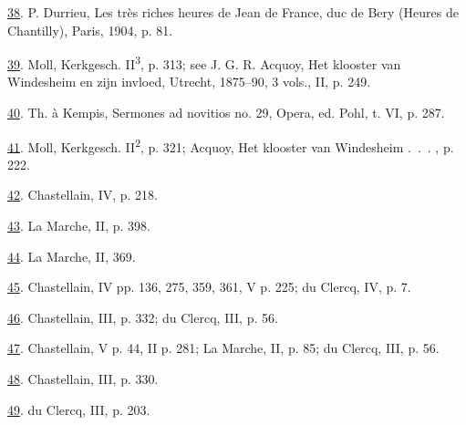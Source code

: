 \protect\hypertarget{23_NOTES.xhtmlux5cux23id_398}{\protect\hyperlink{20_ILLUSTRATIONS_FOLLOW_PAGE.xhtmlux5cux23id_397}{38}}.
P. Durrieu, Les très riches heures de Jean de France, duc de Bery
(Heures de Chantilly), Paris, 1904, p. 81.

\protect\hypertarget{23_NOTES.xhtmlux5cux23id_396}{\protect\hyperlink{20_ILLUSTRATIONS_FOLLOW_PAGE.xhtmlux5cux23id_395}{39}}.
Moll, Kerkgesch. II\textsuperscript{3}, p. 313; see J. G. R. Acquoy, Het
klooster van Windesheim en zijn invloed, Utrecht, 1875--90, 3 vols., II,
p. 249.

\protect\hypertarget{23_NOTES.xhtmlux5cux23id_394}{\protect\hyperlink{20_ILLUSTRATIONS_FOLLOW_PAGE.xhtmlux5cux23id_393}{40}}.
Th. à Kempis, Sermones ad novitios no. 29, Opera, ed. Pohl, t. VI, p.
287.

\protect\hypertarget{23_NOTES.xhtmlux5cux23id_392}{\protect\hyperlink{20_ILLUSTRATIONS_FOLLOW_PAGE.xhtmlux5cux23id_391}{41}}.
Moll, Kerkgesch. II\textsuperscript{2}, p. 321; Acquoy, Het klooster van
Windesheim .~.~. , p. 222.

\protect\hypertarget{23_NOTES.xhtmlux5cux23id_390}{\protect\hyperlink{20_ILLUSTRATIONS_FOLLOW_PAGE.xhtmlux5cux23id_389}{42}}.
Chastellain, IV, p. 218.

\protect\hypertarget{23_NOTES.xhtmlux5cux23id_388}{\protect\hyperlink{20_ILLUSTRATIONS_FOLLOW_PAGE.xhtmlux5cux23id_387}{43}}.
La Marche, II, p. 398.

\protect\hypertarget{23_NOTES.xhtmlux5cux23id_386}{\protect\hyperlink{20_ILLUSTRATIONS_FOLLOW_PAGE.xhtmlux5cux23id_385}{44}}.
La Marche, II, 369.

\protect\hypertarget{23_NOTES.xhtmlux5cux23id_384}{\protect\hyperlink{20_ILLUSTRATIONS_FOLLOW_PAGE.xhtmlux5cux23id_383}{45}}.
Chastellain, IV pp. 136, 275, 359, 361, V p. 225; du Clercq, IV, p. 7.

\protect\hypertarget{23_NOTES.xhtmlux5cux23id_382}{\protect\hyperlink{20_ILLUSTRATIONS_FOLLOW_PAGE.xhtmlux5cux23id_381}{46}}.
Chastellain, III, p. 332; du Clercq, III, p. 56.

\protect\hypertarget{23_NOTES.xhtmlux5cux23id_380}{\protect\hyperlink{20_ILLUSTRATIONS_FOLLOW_PAGE.xhtmlux5cux23id_379}{47}}.
Chastellain, V p. 44, II p. 281; La Marche, II, p. 85; du Clercq, III,
p. 56.

\protect\hypertarget{23_NOTES.xhtmlux5cux23id_378}{\protect\hyperlink{20_ILLUSTRATIONS_FOLLOW_PAGE.xhtmlux5cux23id_377}{48}}.
Chastellain, III, p. 330.

\protect\hypertarget{23_NOTES.xhtmlux5cux23id_376}{\protect\hyperlink{20_ILLUSTRATIONS_FOLLOW_PAGE.xhtmlux5cux23id_375}{49}}.
du Clercq, III, p. 203.

